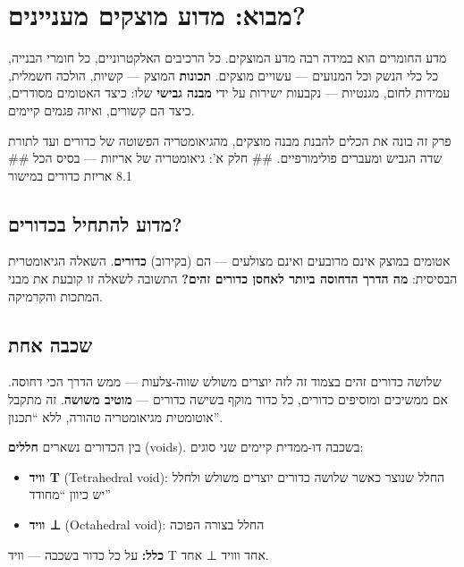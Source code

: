 \documentclass[
  hebrew,
  letterpaper,
  DIV=11,
  numbers=noendperiod]{scrreprt}
\providecommand{\tightlist}{%
  \setlength{\itemsep}{0pt}\setlength{\parskip}{0pt}}
\begin{document}
\section{מבוא: מדוע מוצקים
מעניינים?}\label{ux5deux5d1ux5d5ux5d0-ux5deux5d3ux5d5ux5e2-ux5deux5d5ux5e6ux5e7ux5d9ux5dd-ux5deux5e2ux5e0ux5d9ux5d9ux5e0ux5d9ux5dd}

מדע החומרים הוא במידה רבה מדע המוצקים. כל הרכיבים האלקטרוניים, כל חומרי
הבנייה, כל כלי הנשק וכל המנועים --- עשויים מוצקים. \textbf{תכונות} המוצק
--- קשיות, הולכה חשמלית, עמידות לחום, מגנטיות --- נקבעות ישירות על ידי
\textbf{מבנה גבישי} שלו: כיצד האטומים מסודרים, כיצד הם קשורים, ואיזה
פגמים קיימים.

פרק זה בונה את הכלים להבנת מבנה מוצקים, מהגיאומטריה הפשוטה של כדורים ועד
לתורת שדה הגביש ומעברים פולימורפיים. \#\# חלק א': גיאומטריה של אריזות
--- בסיס הכל \#\# 8.1 אריזת כדורים במישור

\subsection{מדוע להתחיל
בכדורים?}\label{ux5deux5d3ux5d5ux5e2-ux5dcux5d4ux5eaux5d7ux5d9ux5dc-ux5d1ux5dbux5d3ux5d5ux5e8ux5d9ux5dd}

אטומים במוצק אינם מרובעים ואינם מצולעים --- הם (בקירוב) \textbf{כדורים}.
השאלה הגיאומטרית הבסיסית: \textbf{מה הדרך הדחוסה ביותר לאחסן כדורים
זהים?} התשובה לשאלה זו קובעת את מבני המתכות והקרמיקה.

\subsection{שכבה אחת}\label{ux5e9ux5dbux5d1ux5d4-ux5d0ux5d7ux5ea}

שלושה כדורים זהים בצמוד זה לזה יוצרים משולש שווה-צלעות --- ממש הדרך הכי
דחוסה. אם ממשיכים ומוסיפים כדורים, כל כדור מוקף בשישה כדורים ---
\textbf{מוטיב משושה}. זה מתקבל אוטומטית מגיאומטריה טהורה, ללא ``תכנון''.

בין הכדורים נשארים \textbf{חללים} (voids). בשכבה דו-ממדית קיימים שני
סוגים:

\begin{itemize}
\tightlist
\item
  \textbf{וויד T} (Tetrahedral void): החלל שנוצר כאשר שלושה כדורים
  יוצרים משולש ולחלל יש כיוון ``מחודד''
\item
  \textbf{וויד ⊥} (Octahedral void): החלל בצורה הפוכה
\end{itemize}

\textbf{כלל:} על כל כדור בשכבה --- וויד T אחד ווויד ⊥ אחד.
\end{document}
